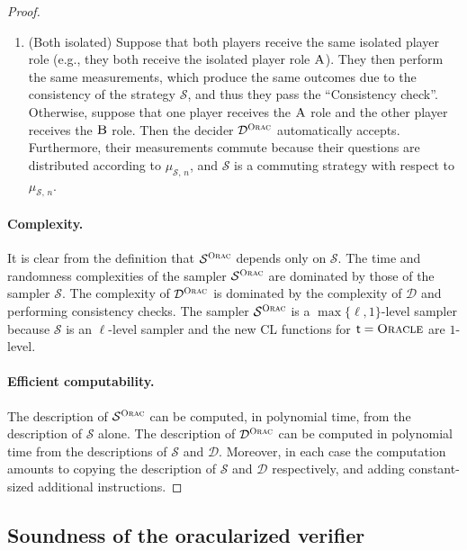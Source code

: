 \documentclass[11pt]{article}
\theoremstyle{definition}
\newcommand{\sampler}{\mathcal{S}}
\newcommand{\decider}{\mathcal{D}}
\newcommand{\strategy}{\mathscr{S}}
\newcommand{\gamestyle}[1]{\ensuremath{\textsc{#1}}\xspace}
\newcommand{\ora}{\gamestyle{Orac}}
\newcommand{\labelstyle}[1]{\ensuremath{\textsc{#1}}\xspace}
\newcommand{\tvarstyle}[1]{\mathsf{#1}}
\newcommand{\tvar}{\ensuremath{\tvarstyle{t}}}
\newcommand{\alice}{\labelstyle{A}}
\newcommand{\bob}{\labelstyle{B}}
\newcommand{\oracle}{\labelstyle{Oracle}}
\begin{document}
\begin{proof}
\begin{enumerate}
  \item ({Both isolated}) Suppose that both players receive the same isolated
    player role (e.g., they both receive the isolated player role $\alice$).
    They then perform the same measurements, which produce the same outcomes due
    to the consistency of the strategy $\strategy$, and thus they pass the
    ``Consistency check''.
    Otherwise, suppose that one player receives the $\alice$ role and the other
    player receives the $\bob$ role.
    Then the decider $\decider^\ora$ automatically accepts.
    Furthermore, their measurements commute because their questions are
    distributed according to $\mu_{\sampler,\, n}$, and $\strategy$ is a
    commuting strategy with respect to $\mu_{\sampler,\, n}$.
  \end{enumerate}

  \paragraph{Complexity.}
  It is clear from the definition that $\sampler^\ora$ depends only on
  $\sampler$.
  The time and randomness complexities of the sampler $\sampler^\ora$ are
  dominated by those of the sampler $\sampler$.
  The complexity of $\decider^\ora$ is dominated by the complexity of $\decider$
  and performing consistency checks.
  The sampler $\sampler^\ora$ is a $\max\{\ell,1\}$-level sampler because
  $\sampler$ is an $\ell$-level sampler and the new CL functions for
  $\tvar=\oracle$ are $1$-level.

  \paragraph{Efficient computability.}
  The description of $\sampler^\ora$ can be computed, in polynomial time, from
  the description of $\sampler$ alone.
  The description of $\decider^\ora$ can be computed in polynomial time from the
  descriptions of $\sampler$ and $\decider$.
  Moreover, in each case the computation amounts to copying the description of
  $\sampler$ and $\decider$ respectively, and adding constant-sized additional
  instructions.

\end{proof}

\subsection{Soundness of the oracularized verifier}
\end{document}

